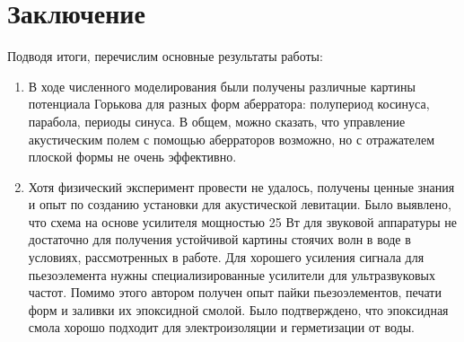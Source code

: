 \section{Заключение}
\label{sec:Chapter5} 
Подводя итоги, перечислим основные результаты работы:
\begin{enumerate}
	\item В ходе численного моделирования были получены различные картины потенциала Горькова для разных форм аберратора: полупериод косинуса, парабола, периоды синуса. В общем, можно сказать, что управление акустическим полем с помощью аберраторов возможно, но с отражателем плоской формы не очень эффективно.
	\item Хотя физический эксперимент провести не удалось, получены ценные знания и опыт по созданию установки для акустической левитации. Было выявлено, что схема на основе усилителя мощностью 25 Вт для звуковой аппаратуры не достаточно для получения устойчивой картины стоячих волн в воде в условиях, рассмотренных в работе. Для хорошего усиления сигнала для пьезоэлемента нужны специализированные усилители для ультразвуковых частот. Помимо этого автором получен опыт пайки пьезоэлементов, печати форм и заливки их эпоксидной смолой. Было подтверждено, что эпоксидная смола хорошо подходит для электроизоляции и герметизации от воды. 
\end{enumerate}
\newpage
